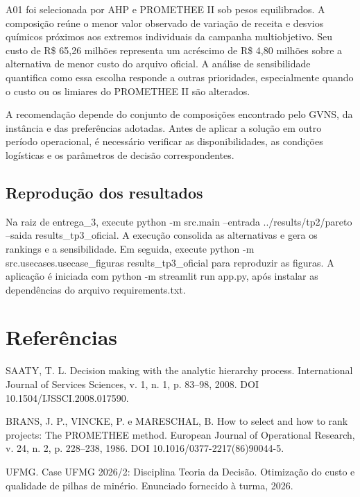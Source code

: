 \documentclass[12pt,a4paper]{article}
\begin{document}
A01 foi selecionada por AHP e PROMETHEE II sob pesos equilibrados. A composição reúne o menor valor observado de variação de receita e desvios químicos próximos aos extremos individuais da campanha multiobjetivo. Seu custo de R\$ 65,26 milhões representa um acréscimo de R\$ 4,80 milhões sobre a alternativa de menor custo do arquivo oficial. A análise de sensibilidade quantifica como essa escolha responde a outras prioridades, especialmente quando o custo ou os limiares do PROMETHEE II são alterados.

A recomendação depende do conjunto de composições encontrado pelo GVNS, da instância e das preferências adotadas. Antes de aplicar a solução em outro período operacional, é necessário verificar as disponibilidades, as condições logísticas e os parâmetros de decisão correspondentes.

\subsection{Reprodução dos resultados}

Na raiz de entrega\_3, execute python -m src.main --entrada ../results/tp2/pareto --saida results\_tp3\_oficial. A execução consolida as alternativas e gera os rankings e a sensibilidade. Em seguida, execute python -m src.usecases.usecase\_figuras results\_tp3\_oficial para reproduzir as figuras. A aplicação é iniciada com python -m streamlit run app.py, após instalar as dependências do arquivo requirements.txt.

\section*{Referências}

SAATY, T. L. Decision making with the analytic hierarchy process. International Journal of Services Sciences, v. 1, n. 1, p. 83–98, 2008. DOI 10.1504/IJSSCI.2008.017590.

BRANS, J. P., VINCKE, P. e MARESCHAL, B. How to select and how to rank projects: The PROMETHEE method. European Journal of Operational Research, v. 24, n. 2, p. 228–238, 1986. DOI 10.1016/0377-2217(86)90044-5.

UFMG. Case UFMG 2026/2: Disciplina Teoria da Decisão. Otimização do custo e qualidade de pilhas de minério. Enunciado fornecido à turma, 2026.
\end{document}
